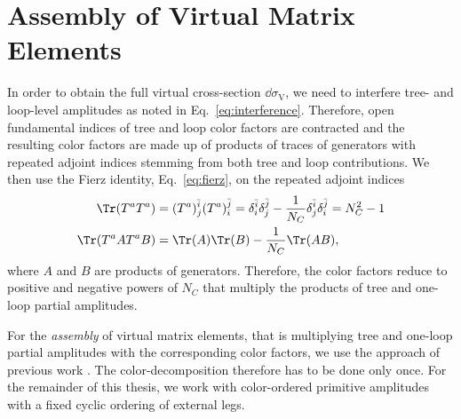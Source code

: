\section{Assembly of Virtual Matrix Elements}
\label{sec:assembly-virt-matr}
In order to obtain the full virtual cross-section $\dd \sigma_{\text{V}}$, we need to
interfere tree- and loop-level amplitudes as noted in
 Eq.~\eqref{eq:interference}. Therefore, open fundamental indices of
 tree and loop color factors are contracted and the resulting color factors are made up of products of
 traces of generators with repeated adjoint indices stemming from both tree and loop contributions. We then use the Fierz identity, Eq.~\eqref{eq:fierz}, on the
 repeated adjoint indices
 \begin{align}
\begin{split}
\Tr(T^aT^a) &= (T^a)_j^{\bar
     i}(T^a)_i^{\bar
     j}=\delta_{i}^{\bar{i}}\delta_{j}^{\bar{j}}-\frac{1}{N_C}\delta_{j}^{\bar{i}}\delta_{i}^{\bar{j}}=N_C^2-1\\
   \Tr(T^aAT^aB)&=\Tr(A)\Tr(B)-\frac{1}{N_C}\Tr(AB),
\end{split}
 \end{align}
where $A$ and $B$ are products of generators. Therefore, the
color factors reduce to positive and negative powers of $N_C$ that
multiply the products of tree and one-loop
 partial amplitudes.

 For the \textit{assembly} of virtual matrix
 elements, that is multiplying tree and one-loop partial amplitudes
 with the corresponding color factors, we use the approach of previous
 work \cite{Ita:2011ar,BH:W4j,BH:W5j,BH:Z4j}. The color-decomposition therefore has to
 be done only once. For the remainder of this thesis, we work with color-ordered primitive amplitudes with a fixed cyclic ordering of
 external legs.



